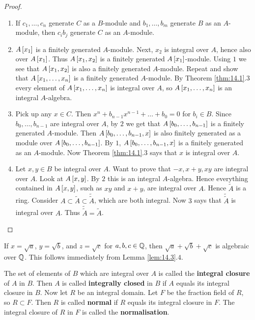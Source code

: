 \begin{proof}
\hfill
\begin{enumerate}
\item If $ c_1, \dots, c_n $ generate $ C $ as a $ B $-module and $ b_1, \dots, b_m $ generate $ B $ as an $ A $-module, then $ c_ib_j $ generate $ C $ as an $ A $-module.
\item $ A\sbr{x_1} $ is a finitely generated $ A $-module. Next, $ x_2 $ is integral over $ A $, hence also over $ A\sbr{x_1} $. Thus $ A\sbr{x_1, x_2} $ is a finitely generated $ A\sbr{x_1} $-module. Using $ 1 $ we see that $ A\sbr{x_1, x_2} $ is also a finitely generated $ A $-module. Repeat and show that $ A\sbr{x_1, \dots, x_n} $ is a finitely generated $ A $-module. By Theorem \ref{thm:14.1}.$ 3 $ every element of $ A\sbr{x_1, \dots, x_n} $ is integral over $ A $, so $ A\sbr{x_1, \dots, x_n} $ is an integral $ A $-algebra.
\item Pick up any $ x \in C $. Then $ x^n + b_{n - 1}x^{n - 1} + \dots + b_0 = 0 $ for $ b_i \in B $. Since $ b_0, \dots, b_{n - 1} $ are integral over $ A $, by $ 2 $ we get that $ A\sbr{b_0, \dots, b_{n - 1}} $ is a finitely generated $ A $-module. Then $ A\sbr{b_0, \dots, b_{n - 1}, x} $ is also finitely generated as a module over $ A\sbr{b_0, \dots, b_{n - 1}} $. By $ 1 $, $ A\sbr{b_0, \dots, b_{n - 1}, x} $ is a finitely generated as an $ A $-module. Now Theorem \ref{thm:14.1}.$ 3 $ says that $ x $ is integral over $ A $.
\item Let $ x, y \in B $ be integral over $ A $. Want to prove that $ -x, x + y, xy $ are integral over $ A $. Look at $ A\sbr{x, y} $. By $ 2 $ this is an integral $ A $-algebra. Hence everything contained in $ A\sbr{x, y} $, such as $ xy $ and $ x + y $, are integral over $ A $. Hence $ \widetilde{A} $ is a ring. Consider $ A \subset \widetilde{A} \subset \widetilde{\widetilde{A}} $, which are both integral. Now $ 3 $ says that $ \widetilde{\widetilde{A}} $ is integral over $ A $. Thus $ \widetilde{\widetilde{A}} = \widetilde{A} $.
\end{enumerate}
\end{proof}

\begin{example*}
If $ x = \sqrt{a} $, $ y = \sqrt{b} $, and $ z = \sqrt{c} $ for $ a, b, c \in \mathbb{Q} $, then $ \sqrt{a} + \sqrt{b} + \sqrt{c} $ is algebraic over $ \mathbb{Q} $. This follows immediately from Lemma \ref{lem:14.3}.$ 4 $.
\end{example*}

\begin{definition}
The set of elements of $ B $ which are integral over $ A $ is called the \textbf{integral closure} of $ A $ in $ B $. Then $ A $ is called \textbf{integrally closed} in $ B $ if $ A $ equals its integral closure in $ B $. Now let $ R $ be an integral domain. Let $ F $ be the fraction field of $ R $, so $ R \subset F $. Then $ R $ is called \textbf{normal} if $ R $ equals its integral closure in $ F $. The integral closure of $ R $ in $ F $ is called the \textbf{normalisation}.
\end{definition}

